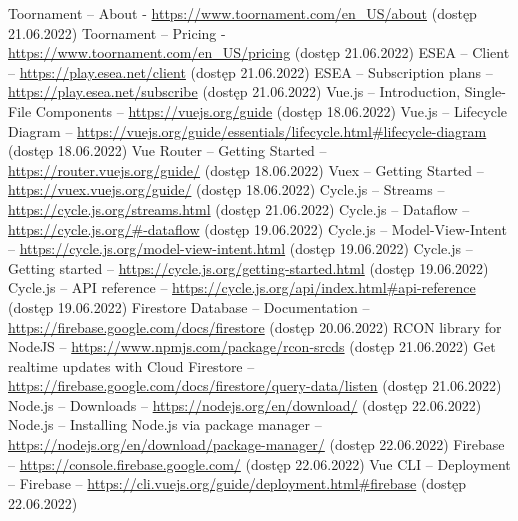 \documentclass[shortabstract]{iithesis}
\theoremstyle{definition} \newtheorem{definition}{Definicja}[]
\theoremstyle{remark} \newtheorem{remark}[definition]{Observation}
\theoremstyle{plain} \newtheorem{theorem}[definition]{Theorem}
\theoremstyle{plain} \newtheorem{lemma}[definition]{Lemma}
\begin{document}
\begin{thebibliography}{1}
     Toornament -- About - \url{https://www.toornament.com/en_US/about} (dostęp 21.06.2022)
     Toornament -- Pricing - \url{https://www.toornament.com/en_US/pricing} (dostęp 21.06.2022)
     ESEA -- Client -- \url{https://play.esea.net/client} (dostęp 21.06.2022)
     ESEA -- Subscription plans -- \url{https://play.esea.net/subscribe} (dostęp 21.06.2022)
     Vue.js -- Introduction, Single-File Components -- \url{https://vuejs.org/guide} (dostęp 18.06.2022)
     Vue.js -- Lifecycle Diagram -- \url{https://vuejs.org/guide/essentials/lifecycle.html#lifecycle-diagram} (dostęp 18.06.2022)
     Vue Router -- Getting Started -- \url{https://router.vuejs.org/guide/} (dostęp 18.06.2022)
     Vuex -- Getting Started -- \url{https://vuex.vuejs.org/guide/} (dostęp 18.06.2022)
     Cycle.js -- Streams -- \url{https://cycle.js.org/streams.html} (dostęp 21.06.2022)
     Cycle.js -- Dataflow -- \url{https://cycle.js.org/#-dataflow} (dostęp 19.06.2022)
     Cycle.js -- Model-View-Intent -- \url{https://cycle.js.org/model-view-intent.html} (dostęp 19.06.2022)
     Cycle.js -- Getting started -- \url{https://cycle.js.org/getting-started.html} (dostęp 19.06.2022)
     Cycle.js -- API reference -- \url{https://cycle.js.org/api/index.html#api-reference} (dostęp 19.06.2022)
     Firestore Database -- Documentation -- \url{https://firebase.google.com/docs/firestore} (dostęp 20.06.2022)
     RCON library for NodeJS -- \url{https://www.npmjs.com/package/rcon-srcds} (dostęp 21.06.2022)
     Get realtime updates with Cloud Firestore -- \url{https://firebase.google.com/docs/firestore/query-data/listen} (dostęp 21.06.2022)
     Node.js -- Downloads -- \url{https://nodejs.org/en/download/} (dostęp 22.06.2022)
     Node.js -- Installing Node.js via package manager -- \url{https://nodejs.org/en/download/package-manager/} (dostęp 22.06.2022)
     Firebase -- \url{https://console.firebase.google.com/} (dostęp 22.06.2022)
     Vue CLI -- Deployment -- Firebase -- \url{https://cli.vuejs.org/guide/deployment.html#firebase} (dostęp 22.06.2022)
\end{thebibliography}
\end{document}
